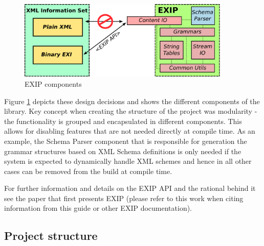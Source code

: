 \begin{figure}[h!]
 \begin{center}
 \includegraphics[width=0.90\textwidth, keepaspectratio=true]{images/EXIP-overview.pdf}
\end{center}
\caption{EXIP components}
\label{fig:EXIP-components} 
\end{figure} 

Figure \ref{fig:EXIP-components} depicts these design decisions and shows the different components of
the library. Key concept when creating the structure of the project was modularity - the functionality
is grouped and encapsulated in different components. This allows for disabling features that are not
needed directly at compile time. As an example, the Schema Parser component that is responsible for
generation the grammar structures based on XML Schema definitions is only needed if the system is
expected to dynamically handle XML schemes and hence in all other cases can be removed from the build at compile time. 

For further information and details on the EXIP API and the rational
behind it see the paper that first presents EXIP \cite{RumenKyusakov2011} (please refer to this work when 
citing information from this guide or other EXIP documentation).

\subsection{Project structure}
\label{sec:project-structure}

